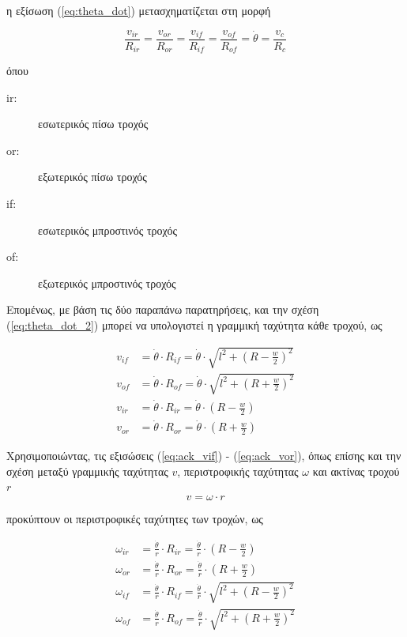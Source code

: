 {\noindent
η εξίσωση (\ref{eq:theta_dot}) μετασχηματίζεται στη μορφή
	
\begin{equation}	
	\frac{v_{ir}}{R_{ir}} = \frac{v_{or}}{R_{or}} = \frac{v_{if}}{R_{if}} = \frac{v_{of}}{R_{of}} = \dot\theta = \frac{v_c}{R_c}
	\label{eq:theta_dot_2}
\end{equation}

\noindent
όπου
\begin{description}
	\item[ir:] εσωτερικός πίσω τροχός
	\item[or:] εξωτερικός πίσω τροχός
	\item[if:] εσωτερικός μπροστινός τροχός
	\item[of:] εξωτερικός μπροστινός τροχός
\end{description}

\bigskip
Επομένως, με βάση τις δύο παραπάνω παρατηρήσεις, και την σχέση (\ref{eq:theta_dot_2}) μπορεί να υπολογιστεί η γραμμική ταχύτητα κάθε τροχού, ως

\begin{align}
	v_{if} &= \dot\theta \cdot R_{if} = \dot\theta \cdot \sqrt{l^2 + (R - \frac{w}{2})^2}
	\label{eq:ack_vif}\\
	v_{of} &= \dot\theta \cdot R_{of} = \dot\theta \cdot \sqrt{l^2 + (R + \frac{w}{2})^2}
	\label{eq:ack_vof}\\
	v_{ir} &= \dot\theta \cdot R_{ir} = \dot\theta \cdot (R - \frac{w}{2})
	\label{eq:ack_vir}\\
	v_{or} &= \dot\theta \cdot R_{or} = \dot\theta \cdot (R + \frac{w}{2})
	\label{eq:ack_vor}
\end{align}

\bigskip
Χρησιμοποιώντας, τις εξισώσεις (\ref{eq:ack_vif}) - (\ref{eq:ack_vor}), όπως επίσης και την σχέση μεταξύ γραμμικής ταχύτητας $v$, περιστροφικής ταχύτητας $\omega$ και ακτίνας τροχού $r$
\begin{equation}
	v = \omega \cdot r
	\label{eq:v_omega}
\end{equation}

\noindent
προκύπτουν οι περιστροφικές ταχύτητες των τροχών, ως

\begin{align}
	\omega_{ir} &= \frac{\dot\theta}{r} \cdot R_{ir} = \frac{\dot\theta}{r} \cdot (R - \frac{w}{2})
	\label{eq:ack_wir}\\
	\omega_{or} &= \frac{\dot\theta}{r} \cdot R_{or} = \frac{\dot\theta}{r} \cdot (R + \frac{w}{2})
	\label{eq:ack_wor}\\
	\omega_{if} &= \frac{\dot\theta}{r} \cdot R_{if} = \frac{\dot\theta}{r} \cdot \sqrt{l^2 + (R - \frac{w}{2})^2}
	\label{eq:ack_wif}\\
	\omega_{of} &= \frac{\dot\theta}{r} \cdot R_{of} = \frac{\dot\theta}{r} \cdot \sqrt{l^2 + (R + \frac{w}{2})^2}
	\label{eq:ack_wof}
\end{align}

}

